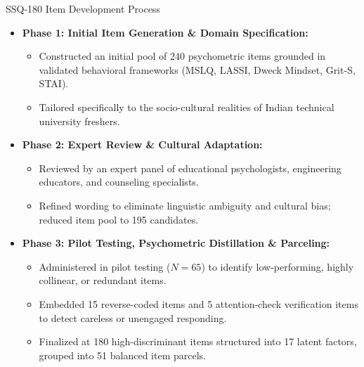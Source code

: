 \documentclass{beamer}
\begin{document}
\begin{frame}[t]{SSQ-180 Item Development Process}
  \begin{itemize}\setlength{\itemsep}{6pt}\small
    \item \textbf{Phase 1: Initial Item Generation \& Domain Specification:}
    \begin{itemize}\setlength{\itemsep}{2pt}\footnotesize
      \item Constructed an initial pool of 240 psychometric items grounded in validated behavioral frameworks (MSLQ, LASSI, Dweck Mindset, Grit-S, STAI).
      \item Tailored specifically to the socio-cultural realities of Indian technical university freshers.
    \end{itemize}
    \item \textbf{Phase 2: Expert Review \& Cultural Adaptation:}
    \begin{itemize}\setlength{\itemsep}{2pt}\footnotesize
      \item Reviewed by an expert panel of educational psychologists, engineering educators, and counseling specialists.
      \item Refined wording to eliminate linguistic ambiguity and cultural bias; reduced item pool to 195 candidates.
    \end{itemize}
    \item \textbf{Phase 3: Pilot Testing, Psychometric Distillation \& Parceling:}
    \begin{itemize}\setlength{\itemsep}{2pt}\footnotesize
      \item Administered in pilot testing ($N = 65$) to identify low-performing, highly collinear, or redundant items.
      \item Embedded 15 reverse-coded items and 5 attention-check verification items to detect careless or unengaged responding.
      \item Finalized at 180 high-discriminant items structured into 17 latent factors, grouped into 51 balanced item parcels.
    \end{itemize}
  \end{itemize}
\end{frame}
\end{document}
